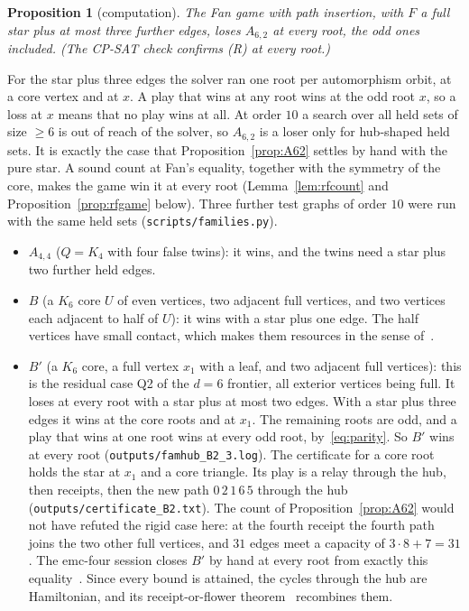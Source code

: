 \documentclass[11pt]{amsart}
\newtheorem{proposition}[theorem]{Proposition}
\theoremstyle{definition}
\begin{document}
\begin{proposition}[computation]\label{prop:A62game}
The Fan game with path insertion, with $F$ a full star plus at most three further edges, loses
$A_{6,2}$ at every root, the odd ones included. (The CP-SAT check confirms (R) at every root.)
\end{proposition}

For the star plus three edges the solver ran one root per automorphism orbit, at a core vertex
and at $x$. A play that wins at any root wins at the odd root $x$, so a loss at $x$ means that no
play wins at all. At order $10$ a search over all held sets of size $\ge6$ is out of reach of the
solver, so $A_{6,2}$ is a loser only for hub-shaped held sets. It is exactly the case that
Proposition~\ref{prop:A62} settles by hand with the pure star. A sound count at Fan's equality,
together with the symmetry of the core, makes the game win it at every root
(Lemma~\ref{lem:rfcount} and Proposition~\ref{prop:rfgame} below). Three further test graphs of
order $10$ were run with the same held sets (\texttt{scripts/families.py}).
\begin{itemize}
\item $A_{4,4}$ ($Q=K_4$ with four false twins): it wins, and the twins need a star plus two
further held edges.
\item $B$ (a $K_6$ core $U$ of even vertices, two adjacent full vertices, and two vertices
each adjacent to half of $U$): it wins with a star plus one edge. The half vertices have small
contact, which makes them resources in the sense of~\cite[\S4]{D6}.
\item $B'$ (a $K_6$ core, a full vertex $x_1$ with a leaf, and two adjacent full vertices): this
is the residual case Q2 of the $d=6$ frontier, all exterior vertices being full. It loses at every
root with a star plus at most two edges. With a star plus three edges it wins at the core roots
and at $x_1$. The remaining roots are odd, and a play that wins at one root wins at every odd
root, by~\eqref{eq:parity}. So $B'$ wins at every root (\texttt{outputs/famhub\_B2\_3.log}). The
certificate for a core root holds the star at $x_1$ and a core triangle. Its play is a relay
through the hub, then receipts, then the new path $0\,2\,1\,6\,5$ through the hub
(\texttt{outputs/certificate\_B2.txt}). The count of Proposition~\ref{prop:A62} would not have
refuted the rigid case here: at the fourth receipt the fourth path joins the two other full
vertices, and $31$ edges meet a capacity of $3\cdot8+7=31$. The emc-four session closes $B'$ by
hand at every root from exactly this equality~\cite[Prop.~68]{ES}. Since every bound is attained,
the cycles through the hub are Hamiltonian, and its receipt-or-flower theorem~\cite[Thm.~67]{ES}
recombines them.
\end{itemize}
\end{document}
